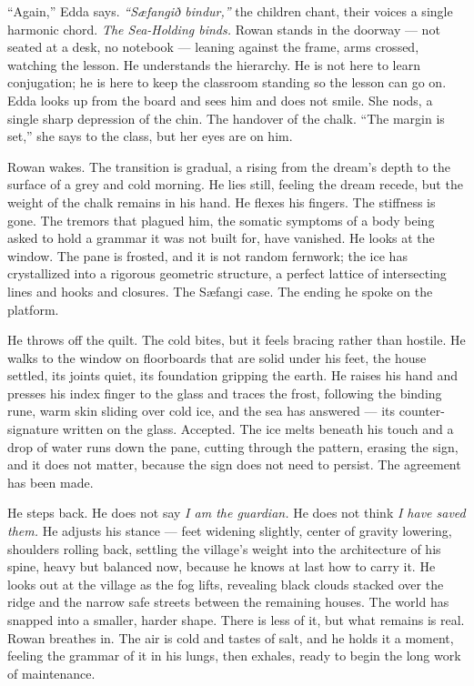 \documentclass[11pt,oneside]{book}
\begin{document}
``Again,'' Edda says. \emph{``Sæfangið bindur,''} the children chant,
their voices a single harmonic chord. \emph{The Sea-Holding binds.}
Rowan stands in the doorway --- not seated at a desk, no notebook ---
leaning against the frame, arms crossed, watching the lesson. He
understands the hierarchy. He is not here to learn conjugation; he is
here to keep the classroom standing so the lesson can go on. Edda looks
up from the board and sees him and does not smile. She nods, a single
sharp depression of the chin. The handover of the chalk. ``The margin is
set,'' she says to the class, but her eyes are on him.

Rowan wakes. The transition is gradual, a rising from the dream's depth
to the surface of a grey and cold morning. He lies still, feeling the
dream recede, but the weight of the chalk remains in his hand. He flexes
his fingers. The stiffness is gone. The tremors that plagued him, the
somatic symptoms of a body being asked to hold a grammar it was not
built for, have vanished. He looks at the window. The pane is frosted,
and it is not random fernwork; the ice has crystallized into a rigorous
geometric structure, a perfect lattice of intersecting lines and hooks
and closures. The Sæfangi case. The ending he spoke on the platform.

He throws off the quilt. The cold bites, but it feels bracing rather
than hostile. He walks to the window on floorboards that are solid under
his feet, the house settled, its joints quiet, its foundation gripping
the earth. He raises his hand and presses his index finger to the glass
and traces the frost, following the binding rune, warm skin sliding over
cold ice, and the sea has answered --- its counter-signature written on
the glass. Accepted. The ice melts beneath his touch and a drop of water
runs down the pane, cutting through the pattern, erasing the sign, and
it does not matter, because the sign does not need to persist. The
agreement has been made.

He steps back. He does not say \emph{I am the guardian.} He does not
think \emph{I have saved them.} He adjusts his stance --- feet widening
slightly, center of gravity lowering, shoulders rolling back, settling
the village's weight into the architecture of his spine, heavy but
balanced now, because he knows at last how to carry it. He looks out at
the village as the fog lifts, revealing black clouds stacked over the
ridge and the narrow safe streets between the remaining houses. The
world has snapped into a smaller, harder shape. There is less of it, but
what remains is real. Rowan breathes in. The air is cold and tastes of
salt, and he holds it a moment, feeling the grammar of it in his lungs,
then exhales, ready to begin the long work of maintenance.
\end{document}

